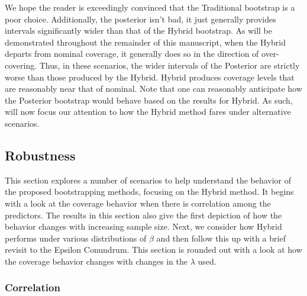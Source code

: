 We hope the reader is exceedingly convinced that the Traditional bootstrap is a poor choice. Additionally, the posterior isn't bad, it just generally provides intervals significantly wider than that of the Hybrid bootstrap. As will be demonstrated throughout the remainder of this manuscript, when the Hybrid departs from nominal coverage, it generally does so in the direction of over-covering. Thus, in these scenarios, the wider intervals of the Posterior are strictly worse than those produced by the Hybrid.  Hybrid produces coverage levels that are reasonably near that of nominal. Note that one can reasonably anticipate how the Posterior bootstrap would behave based on the results for Hybrid. As such, will now focus our attention to how the Hybrid method fares under alternative scenarios. 

\subsection{Robustness}
\label{Sec:robustness}

This section explores a number of scenarios to help understand the behavior of the proposed bootstrapping methods, focusing on the Hybrid method. It begins with a look at the coverage behavior when there is correlation among the predictors. The results in this section also give the first depiction of how the behavior changes with increasing sample size. Next, we consider how Hybrid performs under various distributions of $\beta$ and then follow this up with a brief revisit to the Epsilon Conundrum. This section is rounded out with a look at how the coverage behavior changes with changes in the $\lambda$ used.

\subsubsection{Correlation}
\label{Sec:correlation}

